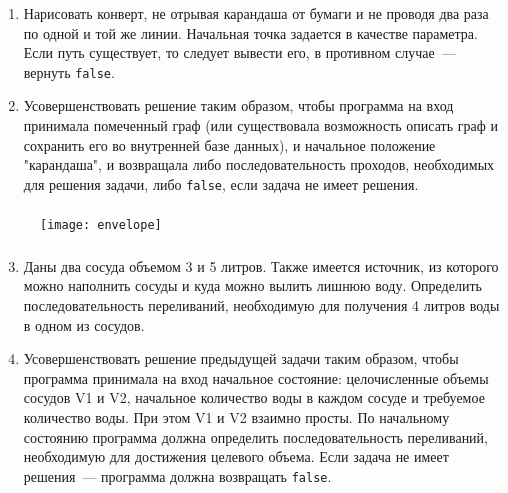 \begin{frame}

	\frametitle{\insertsection}

	\begin{enumerate}
		\item Нарисовать конверт, не отрывая карандаша от бумаги и не проводя два раза по одной и той же линии.
		Начальная точка задается в качестве параметра. Если путь существует, то следует вывести его, в противном случае~--- вернуть \texttt{false}.
		\item Усовершенствовать решение таким образом, чтобы программа на вход принимала помеченный граф (или существовала возможность описать граф и сохранить его во внутренней базе данных),
		и начальное положение "карандаша", и возвращала либо последовательность проходов, необходимых для решения задачи, либо \texttt{false}, если задача не имеет решения.
	\end{enumerate}

\end{frame}

\begin{frame}

	\frametitle{\insertsection}
	
	\begin{figure}
		\texttt{[image: envelope]}
	\end{figure}

\end{frame}

\begin{frame}
	
	\frametitle{\insertsection}
	
	\begin{enumerate}
		\setcounter{enumi}{2}
		\item Даны два сосуда объемом 3 и 5 литров. Также имеется источник, из которого можно наполнить сосуды и куда можно вылить лишнюю воду.
		Определить последовательность переливаний, необходимую для получения 4 литров воды в одном из сосудов.
		\item Усовершенствовать решение предыдущей задачи таким образом, чтобы программа принимала на вход начальное состояние:
		целочисленные объемы сосудов V1 и V2, начальное количество воды в каждом сосуде и требуемое количество воды. При этом V1 и V2 взаимно просты.
		По начальному состоянию программа должна определить последовательность переливаний, необходимую для достижения целевого объема.
		Если задача не имеет решения~--- программа должна возвращать \texttt{false}.
	\end{enumerate}
	
\end{frame}


